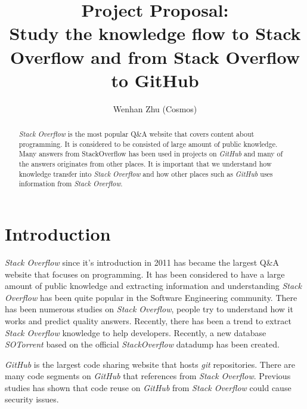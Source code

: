 \documentclass[sigconf]{acmart}
\begin{document}
\title{Project Proposal: \\ Study the knowledge flow to Stack Overflow and from Stack Overflow to GitHub}

\author{Wenhan Zhu (Cosmos)}

\begin{abstract}

{\it Stack Overflow} is the most popular Q\&A website that covers content about programming. It is considered to be consisted of large amount of public knowledge. Many answers from StackOverflow has been used in projects on {\it GitHub} and many of the answers originates from other places. It is important that we understand how knowledge transfer into {\it Stack Overflow} and how other places such as {\it GitHub} uses information from {\it Stack Overflow}.

\end{abstract}


\maketitle

\section{Introduction}

{\it Stack Overflow} since it's introduction in 2011 has became the largest Q\&A website that focuses on programming. It has been considered to have a large amount of public knowledge and extracting information and understanding {\it Stack Overflow} has been quite popular in the Software Engineering community. There has been numerous studies on {\it Stack Overflow}, people try to understand how it works and predict quality answers. Recently, there has been a trend to extract {\it Stack Overflow} knowledge to help developers. \cite{Ponzanelli:2014:MST:2597073.2597077} Recently, a new database {\it SOTorrent} based on the official {\it StackOverflow} datadump has been created.\cite{Baltes:2018:SRA:3196398.3196430} 

{\it GitHub} is the largest code sharing website that hosts {\it git} repositories. There are many code segments on {\it GitHub} that references from {\it Stack Overflow}. Previous studies has shown that code reuse on {\it GitHub} from {\it Stack Overflow} could cause security issues. \cite{7958574} 
\end{document}
